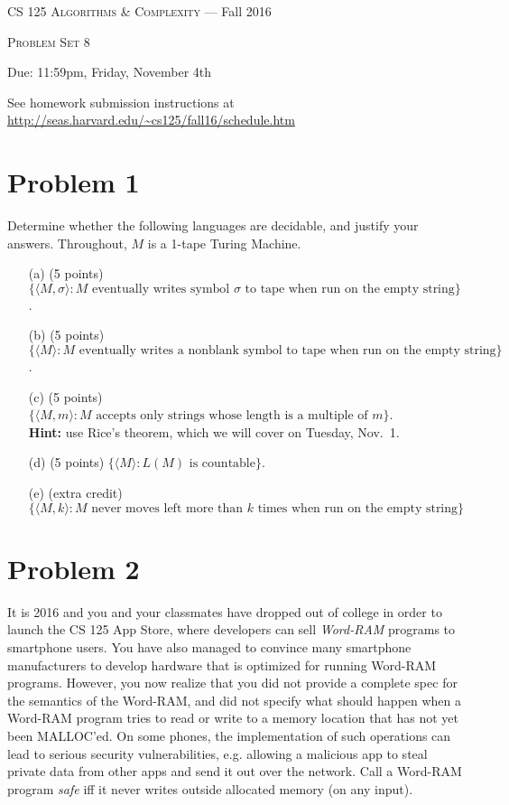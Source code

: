 \documentclass[12pt]{article}
\begin{document}
\thispagestyle{empty}

\begin{center}
{\Large \textsc{CS 125 Algorithms \& Complexity} --- Fall 2016}

\bigskip

{\Large \textsc{Problem Set 8}}

\smallskip

Due: 11:59pm, Friday, November 4th

\bigskip

{\footnotesize See homework submission instructions at \url{http://seas.harvard.edu/~cs125/fall16/schedule.htm}}
\end{center}


\section*{Problem 1} 

Determine whether the following languages are decidable, and justify your answers.  Throughout, $M$ is a 1-tape Turing Machine.

\begin{itemize}
\item[(a)] (5 points) $\{\langle M, \sigma \rangle : \mbox{$M$ eventually writes symbol $\sigma$ to tape when run on the empty string}\}$.
\item[(b)] (5 points) $\{\langle M \rangle : \mbox{$M$ eventually writes a nonblank symbol to tape when run on the empty string}\}$.
\item[(c)] (5 points)  $\{\langle M, m\rangle: \mbox{$M$ accepts only strings whose length is a multiple of $m$}\}$.\\ \textbf{Hint:} use Rice's theorem, which we will cover on Tuesday,  Nov.\ 1.
\item[(d)] (5 points)  $\{\langle M\rangle : \mbox{$L(M)$ is countable}\}$.
\item[(e)] (extra credit) $\{\langle M, k\rangle : \mbox{$M$ never moves left more than $k$ times when run on the empty string}\}$
\end{itemize}

\section*{Problem 2}

It is 2016 and you and your classmates have dropped out of college in order to launch the CS 125 App Store, where developers can
sell {\em Word-RAM} programs to smartphone users.  You have also managed to convince many smartphone manufacturers to develop hardware that is optimized for running Word-RAM programs.  However, you now realize that you did not provide a complete spec for the semantics of the Word-RAM, and did not specify what should happen when a Word-RAM program tries to read or write to a memory location that has not yet been MALLOC'ed.  On some phones, the implementation of such operations can lead to serious security vulnerabilities, e.g. allowing a malicious app to steal private data from other apps and send it out over the network.  Call a Word-RAM program {\em safe} iff it never writes outside allocated memory (on any input).
\end{document}
